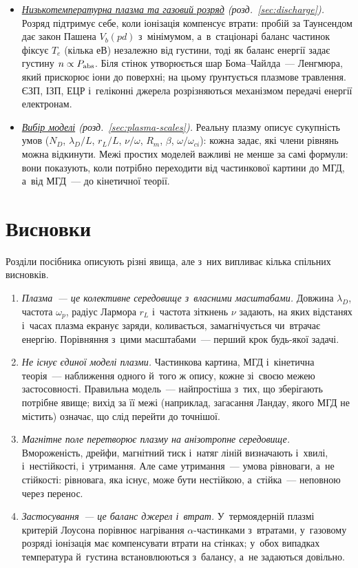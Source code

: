 \documentclass[biblatex]{ConspectBook}
\begin{document}
\begin{itemize}
	  Плазмовий $Q$ не дорівнює інженерному: електростанції потрібні значно більші $Q$, ніж просте $Q>1$.
	\item \emph{\hyperref[sec:discharge]{Низькотемпературна плазма та газовий розряд} (розд.~\ref{sec:discharge}).} Розряд підтримує себе, коли
	  іонізація компенсує втрати: пробій за Таунсендом дає закон Пашена $V_b(pd)$ з~мінімумом, а~в~стаціонарі баланс
	  частинок фіксує $T_e$ (кілька еВ) незалежно від густини, тоді як баланс енергії задає густину $n\propto P_{\rm abs}$.
	  Біля стінок утворюється шар Бома--Чайлда~--- Ленгмюра, який прискорює іони до поверхні; на цьому ґрунтується
	  плазмове травлення. ЄЗП, ІЗП, ЕЦР і~геліконні джерела розрізняються механізмом передачі енергії електронам.
	\item \emph{\hyperref[sec:plasma-scales]{Вибір моделі} (розд.~\ref{sec:plasma-scales}).} Реальну плазму описує сукупність умов ($N_D$, $\lambda_D/L$, $r_L/L$, $\nu/\omega$,
	  $R_m$, $\beta$, $\omega/\omega_{ci}$): кожна задає, які члени рівнянь можна відкинути. Межі простих моделей важливі не менше за самі
	  формули: вони показують, коли потрібно переходити від частинкової картини до МГД, а~від МГД~--- до кінетичної теорії.
\end{itemize}

\section*{Висновки}

Розділи посібника описують різні явища, але з~них випливає кілька спільних висновків.

\begin{enumerate}
	\item \emph{Плазма~--- це колективне середовище з~власними масштабами.} Довжина $\lambda_D$, частота $\omega_p$,
	  радіус Лармора $r_L$ і~частота зіткнень $\nu$ задають, на яких відстанях і~часах плазма екранує заряди, коливається,
	  замагнічується чи~втрачає енергію. Порівняння з~цими масштабами~--- перший крок будь-якої задачі.
	\item \emph{Не існує єдиної моделі плазми.} Частинкова картина, МГД і~кінетична теорія~--- наближення одного й~того ж
	  опису, кожне зі~своєю межею застосовності. Правильна модель~--- найпростіша з~тих, що зберігають потрібне явище; вихід за її
	  межі (наприклад, загасання Ландау, якого МГД не містить) означає, що слід перейти до точнішої.
	\item \emph{Магнітне поле перетворює плазму на анізотропне середовище.} Вмороженість, дрейфи, магнітний тиск і~натяг ліній
	  визначають і~хвилі, і~нестійкості, і~утримання. Але саме утримання~--- умова рівноваги, а~не стійкості: рівновага, яка
	  існує, може бути нестійкою, а~стійка~--- неповною через перенос.
	\item \emph{Застосування~--- це баланс джерел і~втрат.} У~термоядерній плазмі критерій Лоусона порівнює нагрівання
	  $\alpha$-частинками з~втратами, у~газовому розряді іонізація має компенсувати втрати на стінках; у~обох випадках
	  температура й~густина встановлюються з~балансу, а~не задаються довільно.
\end{enumerate}
\end{document}
